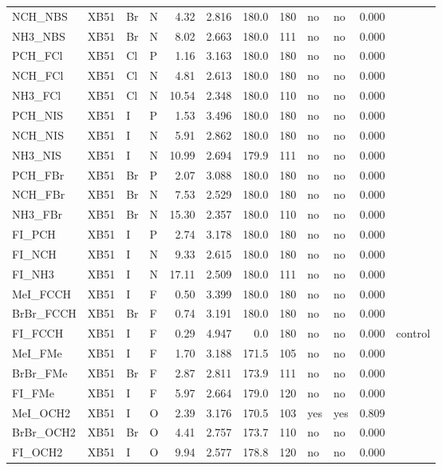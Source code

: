 \documentclass[journal=jcisd8,manuscript=suppinfo]{achemso}
\begin{document}
\begin{singlespace}
{\begin{longtable}{llllrrrrllrl}
NCH\_NBS & XB51 & Br & N & 4.32 & 2.816 & 180.0 & 180 & no & no & 0.000 & \\
NH3\_NBS & XB51 & Br & N & 8.02 & 2.663 & 180.0 & 111 & no & no & 0.000 & \\
PCH\_FCl & XB51 & Cl & P & 1.16 & 3.163 & 180.0 & 180 & no & no & 0.000 & \\
NCH\_FCl & XB51 & Cl & N & 4.81 & 2.613 & 180.0 & 180 & no & no & 0.000 & \\
NH3\_FCl & XB51 & Cl & N & 10.54 & 2.348 & 180.0 & 110 & no & no & 0.000 & \\
PCH\_NIS & XB51 & I & P & 1.53 & 3.496 & 180.0 & 180 & no & no & 0.000 & \\
NCH\_NIS & XB51 & I & N & 5.91 & 2.862 & 180.0 & 180 & no & no & 0.000 & \\
NH3\_NIS & XB51 & I & N & 10.99 & 2.694 & 179.9 & 111 & no & no & 0.000 & \\
PCH\_FBr & XB51 & Br & P & 2.07 & 3.088 & 180.0 & 180 & no & no & 0.000 & \\
NCH\_FBr & XB51 & Br & N & 7.53 & 2.529 & 180.0 & 180 & no & no & 0.000 & \\
NH3\_FBr & XB51 & Br & N & 15.30 & 2.357 & 180.0 & 110 & no & no & 0.000 & \\
FI\_PCH & XB51 & I & P & 2.74 & 3.178 & 180.0 & 180 & no & no & 0.000 & \\
FI\_NCH & XB51 & I & N & 9.33 & 2.615 & 180.0 & 180 & no & no & 0.000 & \\
FI\_NH3 & XB51 & I & N & 17.11 & 2.509 & 180.0 & 111 & no & no & 0.000 & \\
MeI\_FCCH & XB51 & I & F & 0.50 & 3.399 & 180.0 & 180 & no & no & 0.000 & \\
BrBr\_FCCH & XB51 & Br & F & 0.74 & 3.191 & 180.0 & 180 & no & no & 0.000 & \\
FI\_FCCH & XB51 & I & F & 0.29 & 4.947 & 0.0 & 180 & no & no & 0.000 & control\\
MeI\_FMe & XB51 & I & F & 1.70 & 3.188 & 171.5 & 105 & no & no & 0.000 & \\
BrBr\_FMe & XB51 & Br & F & 2.87 & 2.811 & 173.9 & 111 & no & no & 0.000 & \\
FI\_FMe & XB51 & I & F & 5.97 & 2.664 & 179.0 & 120 & no & no & 0.000 & \\
MeI\_OCH2 & XB51 & I & O & 2.39 & 3.176 & 170.5 & 103 & yes & yes & 0.809 & \\
BrBr\_OCH2 & XB51 & Br & O & 4.41 & 2.757 & 173.7 & 110 & no & no & 0.000 & \\
FI\_OCH2 & XB51 & I & O & 9.94 & 2.577 & 178.8 & 120 & no & no & 0.000 & \\

\end{longtable}}
\end{singlespace}
\end{document}
